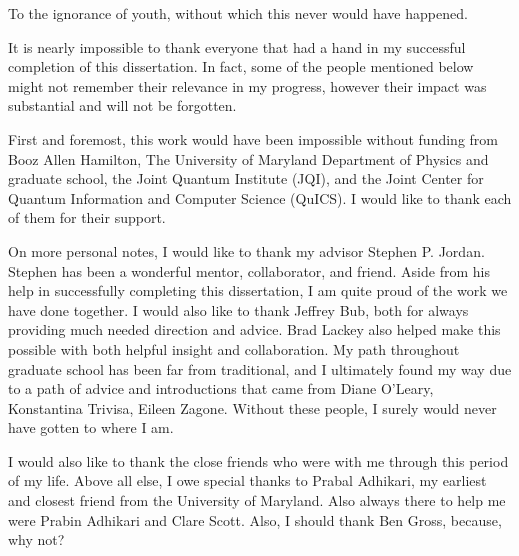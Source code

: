 \documentclass[letterpaper,12pt]{umd-thesis}
\numberwithin{equation}{chapter}
\numberwithin{thm}{chapter}
\numberwithin{lem}{chapter}
\numberwithin{cor}{chapter}
\numberwithin{definition}{chapter}
\begin{document}
\begin{preliminary}

    \begin{preface}
        \lipsum[1]
    \end{preface}

    \begin{foreword}
        \lipsum[1]
    \end{foreword}


	\begin{dedication}
		To the ignorance of youth, without which this never would have happened.
	\end{dedication}

	\begin{acknowledgements}	
		It is nearly impossible to thank everyone that had a hand in my successful completion of this dissertation. In fact, some of the people mentioned below might not remember their relevance in my progress, however their impact was substantial and will not be forgotten.
		
		First and foremost, this work would have been impossible without funding from Booz Allen Hamilton, The University of Maryland Department of Physics and graduate school, the Joint Quantum Institute (JQI), and the Joint Center for Quantum Information and Computer Science (QuICS). I would like to thank each of them for their support. 
		
		On more personal notes, I would like to thank my advisor Stephen P. Jordan. Stephen has been a wonderful mentor, collaborator, and friend. Aside from his help in successfully completing this dissertation, I am quite proud of the work we have done together. I would also like to thank Jeffrey Bub, both for always providing much needed direction and advice. Brad Lackey also helped make this possible with both helpful insight and collaboration. My path throughout graduate school has been far from traditional, and I ultimately found my way due to a path of advice and introductions that came from Diane O'Leary, Konstantina Trivisa, Eileen Zagone. Without these people, I surely would never have gotten to where I am.
		
		I would also like to thank the close friends who were with me through this period of my life. Above all else, I owe special thanks to Prabal Adhikari, my earliest and closest friend from the University of Maryland. Also always there to help me were Prabin Adhikari and Clare Scott. Also, I should thank Ben Gross, because, why not?
		

\end{acknowledgements}
\end{preliminary}
\end{document}
